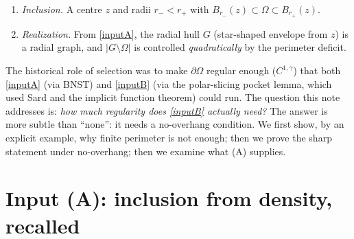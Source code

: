 \documentclass[11pt]{article}
\theoremstyle{definition}
\newcommand{\Om}{\Omega}
\begin{document}
\begin{enumerate}[label=\textup{(\Alph*)}]
\item\label{inputA} \emph{Inclusion.} A centre $z$ and radii
$r_-<r_+$ with
$B_{r_-}(z)\subset\Om\subset B_{r_+}(z)$.
\item\label{inputB} \emph{Realization.} From \ref{inputA}, the radial
hull $G$ (star-shaped envelope from $z$) is a radial graph, and
$|G\setminus\Om|$ is controlled \emph{quadratically} by the perimeter
deficit.
\end{enumerate}

The historical role of selection was to make $\partial\Om$ regular enough
($C^{1,\gamma}$) that both \ref{inputA} (via BNST) and \ref{inputB} (via
the polar-slicing pocket lemma, which used Sard and the implicit function
theorem) could run. The question this note addresses is: \emph{how much
regularity does \ref{inputB} actually need?} The answer is more subtle
than ``none'': it needs a no-overhang condition. We first show, by an
explicit example, why finite perimeter is not enough; then we prove the
sharp statement under no-overhang; then we examine what (A) supplies.

\section{Input (A): inclusion from density, recalled}
\label{sec:inclusion}
\end{document}
